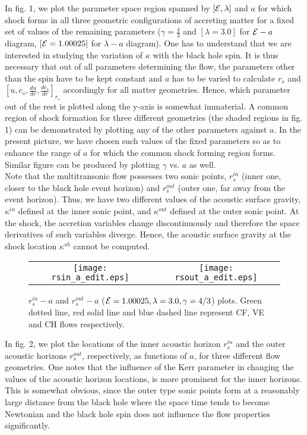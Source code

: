\documentclass[10pt,authoryear]{article}
\begin{document}
In fig. 1, we plot the parameter space region spanned by $\left[{\cal E},\lambda\right]$ and $a$ for which shock forms in all three 
geometric configurations of accreting matter for a fixed set of values of the remaining parameters ($\gamma=\frac{4}{3}$ and 
$\left[\lambda=3.0\right]$ for ${\cal E} - a$ diagram, $\left[{\cal E}=1.00025\right]$ for $\lambda - a$ diagram). One has to 
understand that we are interested in studying the variation of $\kappa$ with the black hole spin. It is thus necessary that out of 
all parameters determining the flow, the parameters other than the spin have to be kept constant and $a$ has to be varied to calculate 
$r_s$ and $\left[u,c_s,\frac{du}{dr},\frac{dc_s}{dr}\right]_{r_s}$ accordingly for all matter geometries. Hence, which parameter out of 
the rest is plotted along the y-axis is somewhat immaterial. A common region of shock formation for three different geometries (the shaded 
regions in fig. 1) can be 
demonstrated by plotting any of the other parameters against $a$. In the present picture, we have chosen such values of the fixed parameters 
so as to enhance the range of $a$ for which the common shock forming region forms. Similar figure can be produced by plotting $\gamma$ vs. $a$ 
as well. \\
Note that the multitransonic flow possesses two sonic points, $r_s^{in}$ (inner one, closer to the black hole event horizon) and $r_s^{out}$ 
(outer one, far away from the event horizon). Thus, we have two different values of the acoustic surface gravity, 
$\kappa^{in}$ defined at the inner sonic point, and $\kappa^{out}$ defined at the outer sonic point. At the shock, the accretion variables change 
discontinuously and therefore the space derivatives of such variables diverge. Hence, the acoustic surface gravity at the shock location $\kappa^{sh}$ 
cannot be computed. 

\begin{figure}[h!]
\centering
\begin{tabular}{cc}
\texttt{[image: rsin\_a\_edit.eps]} &
\texttt{[image: rsout\_a\_edit.eps]}
\end{tabular}
\caption{$r_s^{in} - a$ and $r_s^{out} - a$ (${\cal E}=1.00025,\lambda=3.0,\gamma=4/3$) plots. 
Green dotted line, red solid line and blue dashed line represent CF, VE and CH flows respectively.}
\label{fig2}
\end{figure}

In fig. 2, we plot the locations of the inner acoustic horizon $r_s^{in}$ and the outer acoustic horizons $r_s^{out}$, 
respectively, as functions of $a$, for three different flow geometries. One notes that the influence of the Kerr parameter in changing the values of the 
acoustic horizon locations, is more prominent for the inner horizons. This is somewhat obvious, since the outer type sonic points form at a 
reasonably large distance from the black hole where the space time tends to become Newtonian and the black hole spin does not influence the 
flow properties significantly. \\
\end{document}
